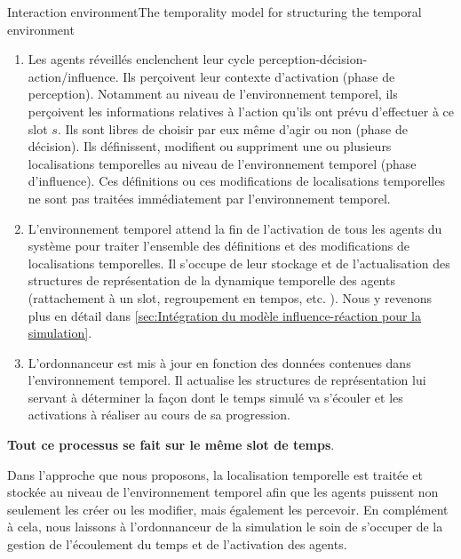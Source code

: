 \begin{frame}{Interaction environment}{The temporality model for structuring the temporal environment}
{\begin{enumerate}
    \item Les agents réveillés enclenchent leur cycle perception-décision-action/influence. Ils perçoivent leur contexte d'activation (phase de perception). Notamment au niveau de l'environnement temporel, ils perçoivent les informations relatives à l'action qu'ils ont prévu d'effectuer à ce slot $s$. Ils sont libres de choisir par eux même d'agir ou non (phase de décision). Ils définissent, modifient ou suppriment une ou plusieurs localisations temporelles au niveau de l'environnement temporel (phase d'influence). Ces définitions ou ces modifications de localisations temporelles ne sont pas traitées immédiatement par l'environnement temporel. 
    \item  L'environnement temporel attend la fin de l'activation de tous les agents du système pour traiter l'ensemble des définitions et des modifications de localisations temporelles. Il s'occupe de leur stockage et de l'actualisation des structures de représentation de la dynamique temporelle des agents (rattachement à un slot, regroupement en tempos, etc. ). Nous y revenons plus en détail dans \ref{sec:Intégration du modèle influence-réaction pour la simulation}.
    \item  L'ordonnanceur est  mis à jour en fonction des données contenues dans l'environnement temporel. Il actualise les structures de représentation lui servant à déterminer la façon dont le temps simulé va s’écouler et les activations à réaliser au cours de sa progression.
\end{enumerate}
\textbf{Tout ce processus se fait sur le même slot de temps}.

Dans l'approche que nous proposons, la localisation temporelle est traitée et stockée au niveau de l'environnement temporel afin que les agents puissent non seulement les créer ou les modifier, mais également les percevoir. En complément à cela, nous laissons à l'ordonnanceur de la simulation le soin de s'occuper de la gestion de l'écoulement du temps et de l'activation des agents. 
}
\end{frame}

